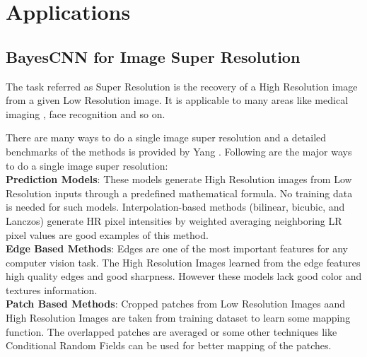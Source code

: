 \chapter{Applications}


\pagebreak



\section{BayesCNN for Image Super Resolution}

The task referred as Super Resolution is the recovery of a High Resolution image from a given Low Resolution image. It is applicable to many areas like medical imaging \citet{10.1007/978-3-642-40760-4_2}, face recognition \citet{1203152} and so on.

There are many ways to do a single image super resolution and a detailed benchmarks of the methods is provided by Yang \citet{Yang2014SingleImageSA}. Following are the major ways to do a single image super resolution:\\ 

\textbf{Prediction Models}: These models generate High Resolution images
from Low Resolution inputs through a predefined mathematical formula. No training data is needed for such models. Interpolation-based methods (bilinear, bicubic, and Lanczos) generate HR pixel intensities by weighted averaging neighboring LR pixel values are good examples of this method.\\

\textbf{Edge Based Methods}: Edges are one of the most important features for any computer vision task. The High Resolution Images learned from the edge features high quality edges and good sharpness. However these models lack good color and textures information.\\

\textbf{Patch Based Methods}: Cropped patches from Low Resolution Images aand High Resolution Images are taken from training dataset to learn some mapping function. The overlapped patches are averaged or some other techniques like Conditional Random Fields \citet{lafferty2001conditional} can be used for better mapping of the patches.  


